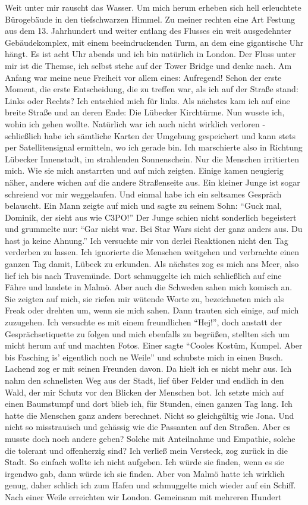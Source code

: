 Weit unter mir rauscht das Wasser. Um mich herum erheben sich hell erleuchtete Bürogebäude in den tiefschwarzen Himmel. Zu meiner rechten eine Art Festung aus dem 13. Jahrhundert und weiter entlang des Flusses ein weit ausgedehnter Gebäudekomplex, mit einem beeindruckenden Turm, an dem eine gigantische Uhr hängt. Es ist acht Uhr abends und ich bin natürlich in London. Der Fluss unter mir ist die Themse, ich selbst stehe auf der Tower Bridge und denke nach. Am Anfang war meine neue Freiheit vor allem eines: Aufregend! Schon der erste Moment, die erste Entscheidung, die zu treffen war, als ich auf der Straße stand: Links oder Rechts? Ich entschied mich für links. Als nächstes kam ich auf eine breite Straße und an deren Ende: Die Lübecker Kirchtürme. Nun wusste ich, wohin ich gehen wollte. Natürlich war ich auch nicht wirklich verloren - schließlich habe ich sämtliche Karten der Umgebung gespeichert und kann stets per Satellitensignal ermitteln, wo ich gerade bin. Ich marschierte also in Richtung Lübecker Innenstadt, im strahlenden Sonnenschein. Nur die Menschen irritierten mich. Wie sie mich anstarrten und auf mich zeigten. Einige kamen neugierig näher, andere wichen auf die andere Straßenseite aus. Ein kleiner Junge ist sogar schreiend vor mir weggelaufen. Und einmal habe ich ein seltsames Gespräch belauscht. Ein Mann zeigte auf mich und sagte zu seinem Sohn: "`Guck mal, Dominik, der sieht aus wie C3PO!"' Der Junge schien nicht sonderlich begeistert und grummelte nur: "`Gar nicht war. Bei Star Wars sieht der ganz anders aus. Du hast ja keine Ahnung."' Ich versuchte mir von derlei Reaktionen nicht den Tag verderben zu lassen. Ich ignorierte die Menschen weitgehen und verbrachte einen ganzen Tag damit, Lübeck zu erkunden. Als nächstes zog es mich ans Meer, also lief ich bis nach Travemünde. Dort schmuggelte ich mich schließlich auf eine Fähre und landete in Malmö. Aber auch die Schweden sahen mich komisch an. Sie zeigten auf mich, sie riefen mir wütende Worte zu, bezeichneten mich als Freak oder drehten um, wenn sie mich sahen. Dann trauten sich einige, auf mich zuzugehen. Ich versuchte es mit einem freundlichen "`Hej!"', doch anstatt der Gesprächsetiquette zu folgen und mich ebenfalls zu begrüßen, stellten sich um micht herum auf und machten Fotos. Einer sagte "`Cooles Kostüm, Kumpel. Aber bis Fasching is' eigentlich noch ne Weile"' und schubste mich in einen Busch. Lachend zog er mit seinen Freunden davon. Da hielt ich es nicht mehr aus. Ich nahm den schnellsten Weg aus der Stadt, lief über Felder und endlich in den Wald, der mir Schutz vor den Blicken der Menschen bot. Ich setzte mich auf einen Baumstumpf und dort blieb ich, für Stunden, einen ganzen Tag lang. Ich hatte die Menschen ganz anders berechnet. Nicht so gleichgültig wie Jona. Und nicht so misstrauisch und gehässig wie die Passanten auf den Straßen. Aber es musste doch noch andere geben? Solche mit Anteilnahme und Empathie, solche die tolerant und offenherzig sind? Ich verließ mein Versteck, zog zurück in die Stadt. So einfach wollte ich nicht aufgeben. Ich würde sie finden, wenn es sie irgendwo gab, dann würde ich sie finden. Aber von Malmö hatte ich wirklich genug, daher schlich ich zum Hafen und schmuggelte mich wieder auf ein Schiff. Nach einer Weile erreichten wir London. Gemeinsam mit mehreren Hundert 